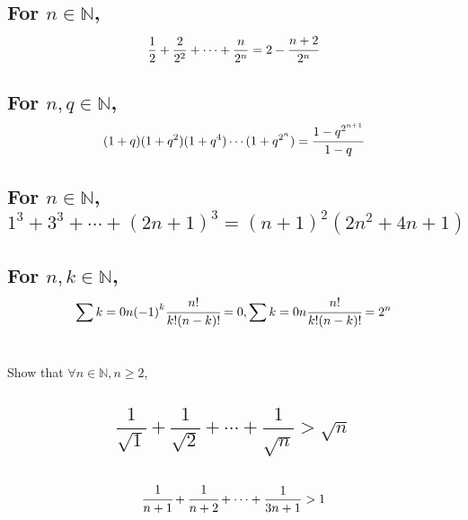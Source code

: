 \documentclass[]{article}
\newcommand{\N}{\mathbb{N}}
\begin{document}
\subsection{For $n \in \N$,
    $$\frac{1}{2} + \frac{2}{2^2} + \cdots + \frac{n}{2^n} = 2 - \cfrac{n+2}{2^n}$$
}




\subsection{For $n,q \in \N$,
    $$(1+q)(1+q^2)(1+q^4)\cdots(1+q^{2^n}) = \cfrac{1-q^{2^{n+1}}}{1-q}$$
}




\subsection{For $n \in \N$,
    $$1^3 + 3^3 + \cdots + (2n + 1)^3 = (n+1)^2 (2n^2 + 4n + 1)$$
}







\subsection{For $n,k \in \N$,
    $$\sum{k=0}{n} \qty(-1)^k \cfrac{n!}{k!(n-k)!} = 0, 
    \sum{k=0}{n} \cfrac{n!}{k!(n-k)!} = 2^n$$
}














\newpage
\section{}
Show that $\forall n \in \N, n \geq 2$,

\subsection{
    $$\frac{1}{\sqrt{1}} + \frac{1}{\sqrt{2}} + \cdots + \frac{1}{\sqrt{n}} > \sqrt{n}$$
}




\subsection{
    $$\cfrac{1}{n+1} + \cfrac{1}{n+2} + \cdots + \frac{1}{3n+1} > 1$$
}
\end{document}
